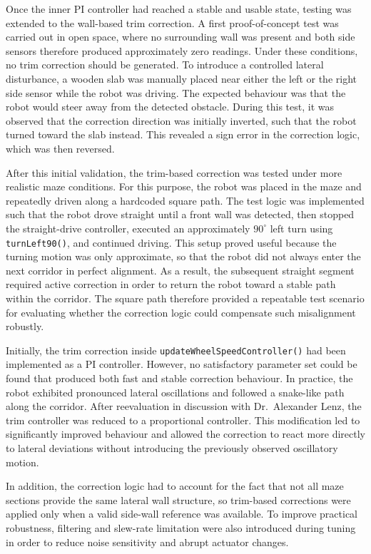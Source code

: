 Once the inner PI controller had reached a stable and usable state, testing was extended to the wall-based trim correction. A first proof-of-concept test was carried out in open space, where no surrounding wall was present and both side sensors therefore produced approximately zero readings. Under these conditions, no trim correction should be generated. To introduce a controlled lateral disturbance, a wooden slab was manually placed near either the left or the right side sensor while the robot was driving. The expected behaviour was that the robot would steer away from the detected obstacle. During this test, it was observed that the correction direction was initially inverted, such that the robot turned toward the slab instead. This revealed a sign error in the correction logic, which was then reversed.

After this initial validation, the trim-based correction was tested under more realistic maze conditions. For this purpose, the robot was placed in the maze and repeatedly driven along a hardcoded square path. The test logic was implemented such that the robot drove straight until a front wall was detected, then stopped the straight-drive controller, executed an approximately $90^\circ$ left turn using \texttt{turnLeft90()}, and continued driving. This setup proved useful because the turning motion was only approximate, so that the robot did not always enter the next corridor in perfect alignment. As a result, the subsequent straight segment required active correction in order to return the robot toward a stable path within the corridor. The square path therefore provided a repeatable test scenario for evaluating whether the correction logic could compensate such misalignment robustly.

Initially, the trim correction inside \texttt{updateWheelSpeedController()} had been implemented as a PI controller. However, no satisfactory parameter set could be found that produced both fast and stable correction behaviour. In practice, the robot exhibited pronounced lateral oscillations and followed a snake-like path along the corridor. After reevaluation in discussion with Dr.\ Alexander Lenz, the trim controller was reduced to a proportional controller. This modification led to significantly improved behaviour and allowed the correction to react more directly to lateral deviations without introducing the previously observed oscillatory motion.

In addition, the correction logic had to account for the fact that not all maze sections provide the same lateral wall structure, so trim-based corrections were applied only when a valid side-wall reference was available. To improve practical robustness, filtering and slew-rate limitation were also introduced during tuning in order to reduce noise sensitivity and abrupt actuator changes.

